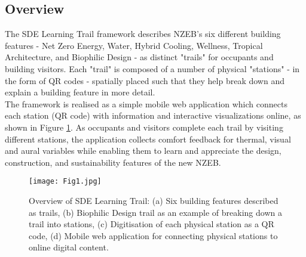 

\subsection{Overview}

The SDE Learning Trail framework describes NZEB's six different building features - Net Zero Energy, Water, Hybrid Cooling, Wellness, Tropical Architecture, and Biophilic Design - as distinct "trails" for occupants and building visitors. Each "trail" is composed of a number of physical "stations" - in the form of QR codes - spatially placed such that they help break down and explain a building feature in more detail.\\

The framework is realised as a simple mobile web application which connects each station (QR code) with information and interactive visualizations online, as shown in Figure \ref{fig:framework}. As occupants and visitors complete each trail by visiting different stations, the application collects comfort feedback for thermal, visual and aural variables while enabling them to learn and appreciate the design, construction, and sustainability features of the new NZEB.\\

\begin{figure}
\begin{center}
\texttt{[image: Fig1.jpg]}
\caption{Overview of SDE Learning Trail: (a) Six building features described as trails, (b) Biophilic Design trail as an example of breaking down a trail into stations, (c) Digitisation of each physical station as a QR code, (d) Mobile web application for connecting physical stations to online digital content.}
\label{fig:framework}
\end{center}
\end{figure}




